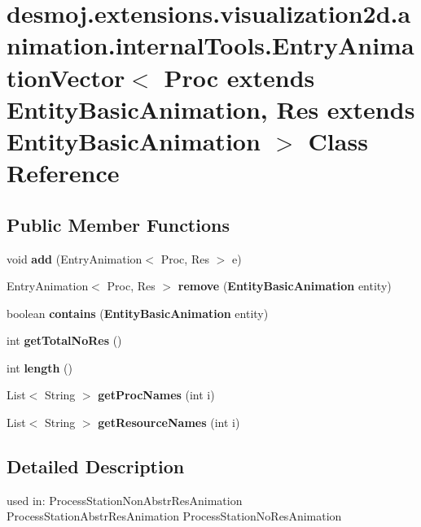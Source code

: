 \section{desmoj.\-extensions.\-visualization2d.\-animation.\-internal\-Tools.\-Entry\-Animation\-Vector$<$ Proc extends Entity\-Basic\-Animation, Res extends Entity\-Basic\-Animation $>$ Class Reference}
\label{classdesmoj_1_1extensions_1_1visualization2d_1_1animation_1_1internal_tools_1_1_entry_animation_55a40e8903d15c29dee0fa8317571087}
\subsection*{Public Member Functions}
\begin{DoxyCompactItemize}
\item 
void {\bfseries add} (Entry\-Animation$<$ Proc, Res $>$ e)\label{classdesmoj_1_1extensions_1_1visualization2d_1_1animation_1_1internal_tools_1_1_entry_animation_55a40e8903d15c29dee0fa8317571087_afd74b130f571dc4841cdf3912adca48d}

\item 
Entry\-Animation$<$ Proc, Res $>$ {\bfseries remove} ({\bf Entity\-Basic\-Animation} entity)\label{classdesmoj_1_1extensions_1_1visualization2d_1_1animation_1_1internal_tools_1_1_entry_animation_55a40e8903d15c29dee0fa8317571087_ad04bcfde02964531aba783414f9d3705}

\item 
boolean {\bfseries contains} ({\bf Entity\-Basic\-Animation} entity)\label{classdesmoj_1_1extensions_1_1visualization2d_1_1animation_1_1internal_tools_1_1_entry_animation_55a40e8903d15c29dee0fa8317571087_a43610a09d2034773cd05565fc62ede3c}

\item 
int {\bf get\-Total\-No\-Res} ()
\item 
int {\bf length} ()
\item 
List$<$ String $>$ {\bf get\-Proc\-Names} (int i)
\item 
List$<$ String $>$ {\bf get\-Resource\-Names} (int i)
\end{DoxyCompactItemize}


\subsection{Detailed Description}
used in\-: Process\-Station\-Non\-Abstr\-Res\-Animation Process\-Station\-Abstr\-Res\-Animation Process\-Station\-No\-Res\-Animation

